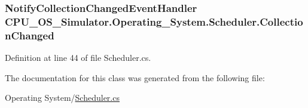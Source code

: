\subsubsection[{Collection\+Changed}]{\setlength{\rightskip}{0pt plus 5cm}Notify\+Collection\+Changed\+Event\+Handler C\+P\+U\+\_\+\+O\+S\+\_\+\+Simulator.\+Operating\+\_\+\+System.\+Scheduler.\+Collection\+Changed}\label{class_c_p_u___o_s___simulator_1_1_operating___system_1_1_scheduler_a13cc271f1cf9b76d1cbc87988c45e1fb}


Definition at line 44 of file Scheduler.\+cs.



The documentation for this class was generated from the following file\+:\begin{DoxyCompactItemize}
\item 
Operating System/\hyperlink{_scheduler_8cs}{Scheduler.\+cs}\end{DoxyCompactItemize}
